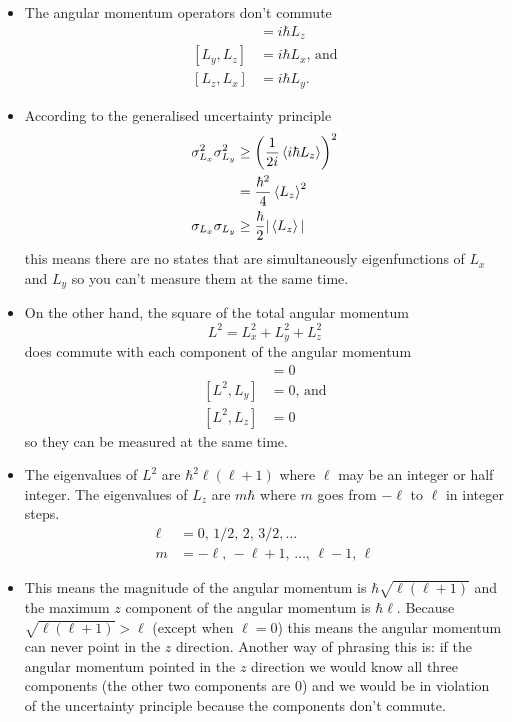 \documentclass{article}
\begin{document}
\begin{itemize}
  \item The angular momentum operators don't commute \begin{align*}
          [L_x, L_y] & = i \hbar L_z              \\
          [L_y, L_z] & = i \hbar L_x \text{, and} \\
          [L_z, L_x] & = i \hbar L_y.
        \end{align*}

  \item According to the generalised uncertainty principle \begin{align*}
          \sigma_{L_x}^2 \sigma_{L_y}^2 & \ge \left( \frac{1}{2 i} \braket{i \hbar L_z} \right)^2 \\
                                        & = \frac{\hbar^2}{4} \braket{L_z}^2                      \\
          \sigma_{L_x} \sigma_{L_y}     & \ge \frac{\hbar}{2} |\braket{L_z}|
        \end{align*} this means there are no states that are simultaneously eigenfunctions of $L_x$ and $L_y$ so you can't measure them at the same time.

  \item On the other hand, the square of the total angular momentum \[L^2 = L_x^2 + L_y^2 + L_z^2\] does commute with each component of the angular momentum \begin{align*}
          [L^2, L_x] & = 0              \\
          [L^2, L_y] & = 0 \text{, and} \\
          [L^2, L_z] & = 0
        \end{align*} so they can be measured at the same time.

  \item The eigenvalues of $L^2$ are $\hbar^2 \ell (\ell + 1)$ where $\ell$ may be an integer or half integer. The eigenvalues of $L_z$ are $m \hbar$ where $m$ goes from $-\ell$ to $\ell$ in integer steps. \begin{align*}
          \ell & = 0, \,1 / 2, \,2, \,3 / 2, \ldots                 \\
          m    & = -\ell, \,-\ell + 1, \,\ldots, \,\ell - 1, \,\ell
        \end{align*}

  \item This means the magnitude of the angular momentum is $\hbar \sqrt{\ell (\ell + 1)}$ and the maximum $z$ component of the angular momentum is $\hbar \ell$. Because $\sqrt{\ell (\ell + 1)} > \ell$ (except when $\ell = 0$) this means the angular momentum can never point in the $z$ direction. Another way of phrasing this is: if the angular momentum pointed in the $z$ direction we would know all three components (the other two components are $0$) and we would be in violation of the uncertainty principle because the components don't commute.
\end{itemize}
\end{document}
